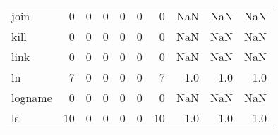 \begin{longtable}{lrrrrrrrrr}
join      &                                                  0 &                                                  0 &                                                  0 &                                                  0 &                                                  0 &                                                  0 &                                                NaN &                                    NaN &                                  NaN \\
kill      &                                                  0 &                                                  0 &                                                  0 &                                                  0 &                                                  0 &                                                  0 &                                                NaN &                                    NaN &                                  NaN \\
link      &                                                  0 &                                                  0 &                                                  0 &                                                  0 &                                                  0 &                                                  0 &                                                NaN &                                    NaN &                                  NaN \\
ln        &                                                  7 &                                                  0 &                                                  0 &                                                  0 &                                                  0 &                                                  7 &                                                1.0 &                                    1.0 &                                  1.0 \\
logname   &                                                  0 &                                                  0 &                                                  0 &                                                  0 &                                                  0 &                                                  0 &                                                NaN &                                    NaN &                                  NaN \\
ls        &                                                 10 &                                                  0 &                                                  0 &                                                  0 &                                                  0 &                                                 10 &                                                1.0 &                                    1.0 &                                  1.0 \\

\end{longtable}
